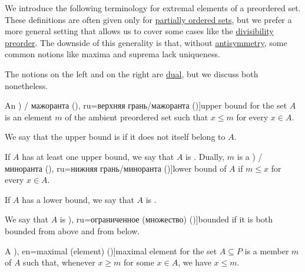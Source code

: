 \begin{definition}\label{def:extremal_points}
  We introduce the following terminology for extremal elements of a preordered set. These definitions are often given only for \hyperref[def:partially_ordered_set]{partially ordered sets}, but we prefer a more general setting that allows us to cover some cases like the \hyperref[thm:semiring_divisibility_order]{divisibility preorder}. The downside of this generality is that, without \hyperref[def:binary_relation/antisymmetric]{antisymmetry}, some common notions like maxima and suprema lack uniqueness.

  The notions on the left and on the right are \hyperref[thm:preorder_duality]{dual}, but we discuss both nonetheless.

  \begin{thmenum}
    \begin{TwoColumns*}
      An \term[bg=горна граница (\cite[18]{Тагамлицки1971Диф}) / мажоранта (\cite[10]{Проданов1982}), ru=верхняя грань/мажоранта (\cite[def. 3.8]{Гуров2013})]{upper bound} for the set \( A \) is an element \( m \) of the ambient preordered set such that \( x \leq m \) for every \( x \in A \).

      We say that the upper bound is  if it does not itself belong to \( A \).

      If \( A \) has at least one upper bound, we say that \( A \) is .
    \BeginSecondColumn
      Dually, \( m \) is a \term[bg=долна граница (\cite[18]{Тагамлицки1971Диф}) / миноранта (\cite[10]{Проданов1982}), ru=нижняя грань/миноранта (\cite[def. 3.8]{Гуров2013})]{lower bound} of \( A \) if \( m \leq x \) for every \( x \in A \).

      If \( A \) has a lower bound, we say that \( A \) is .

      We say that \( A \) is \term[bg=ограничено (множество) (\cite[19]{Тагамлицки1971Диф}), ru=ограниченное (множество) (\cite[39]{Зорич2019Том1})]{bounded} if it is both bounded from above and from below.
    \end{TwoColumns*}

    \mimprovised
    \begin{TwoColumns*}
      A \term[ru=максимальный (елемент) (\cite[def. 3.6]{Гуров2013}), en=maximal (element) (\cite[33]{Harzheim2005})]{maximal element} for the set \( A \subseteq P \) is a member \( m \) of \( A \) such that, whenever \( x \geq m \) for some \( x \in A \), we have \( x \leq m \).


\end{TwoColumns*}
\end{thmenum}
\end{definition}
